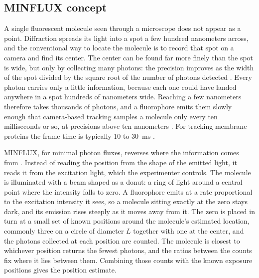 \documentclass{article}
\begin{document}
\subsection{MINFLUX concept}
\label{sec:minflux}

A single fluorescent molecule seen through a microscope does not appear as a point. Diffraction
spreads its light into a spot a few hundred nanometers across, and the conventional way to locate
the molecule is to record that spot on a camera and find its center. The center can be found far
more finely than the spot is wide, but only by collecting many photons: the precision improves as
the width of the spot divided by the square root of the number of photons detected
\cite{oberLocalizationAccuracySinglemolecule2004,smithFastSinglemoleculeLocalization2010}. Every photon
carries only a little information, because each one could have landed anywhere in a spot hundreds
of nanometers wide. Reaching a few nanometers therefore takes thousands of photons, and a
fluorophore emits them slowly enough that camera-based tracking samples a molecule only every ten
milliseconds or so, at precisions above ten nanometers
\cite{eilersMINFLUXMonitorsRapid2018}. For tracking membrane proteins the frame time is
typically 10 to 30~ms \cite{becerraQuantifyingProteinInteractions2024}.

MINFLUX, for minimal photon fluxes, reverses where the information comes from
\cite{balzarottiNanometerResolutionImaging2017}. Instead of reading the position from the shape of
the emitted light, it reads it from the excitation light, which the experimenter controls. The
molecule is illuminated with a beam shaped as a donut: a ring of light around a central point
where the intensity falls to zero. A fluorophore emits at a rate proportional to the excitation
intensity it sees, so a molecule sitting exactly at the zero stays dark, and its emission rises
steeply as it moves away from it. The zero is placed in turn at a small set of known positions
around the molecule's estimated location, commonly three on a circle of diameter $L$ together
with one at the center, and the photons collected at each position are counted. The molecule is
closest to whichever position returns the fewest photons, and the ratios between the counts fix
where it lies between them. Combining those counts with the known exposure positions gives the
position estimate.
\end{document}

